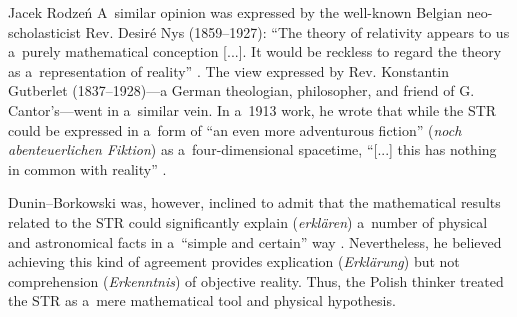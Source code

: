 \begin{artengenv}{Jacek Rodzeń}
A~similar opinion was expressed by the well-known Belgian neo-scholasticist Rev. Desiré Nys (1859–1927): ``The theory of relativity appears to us a~purely mathematical conception [...]. It would be reckless to regard the theory as a~representation of reality''
\parencite*[][p.321]{nys_notion_1922}. %
 The view expressed by Rev. Konstantin Gutberlet (1837–1928)---a German theologian, philosopher, and friend of G. Cantor's---went in a~similar vein. In a~1913 work, he wrote that while the STR could be expressed in a~form of ``an even more adventurous fiction'' (\textit{noch abenteuerlichen Fiktion}) as a~four-dimensional spacetime, ``[...] this has nothing in common with reality'' 
\parencite*[][p.334]{gutberlet_streit_1913}.%


Dunin–Borkowski was, however, inclined to admit that the mathematical results related to the STR could significantly explain (\textit{erklären}) a~number of physical and astronomical facts in a~``simple and certain'' way
\parencite*[][p.212]{dunin-borkowski_neue_1921}. %
 Nevertheless, he believed achieving this kind of agreement provides explication (\textit{Erklärung}) but not comprehension (\textit{Erkenntnis}) of objective reality. Thus, the Polish thinker treated the STR as a~mere mathematical tool and physical hypothesis.


\end{artengenv}
